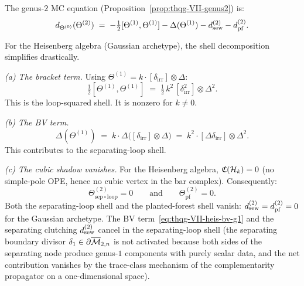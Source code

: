 \begin{computation}
\label{comp:thqg-VII-heis-g2}
The genus-$2$ MC equation
(Proposition~\ref{prop:thqg-VII-genus2}) is:
\begin{equation}\label{eq:thqg-VII-heis-mc-g2}
d_{\Theta^{(0)}}(\Theta^{(2)})
\;=\;
-\tfrac{1}{2}[\Theta^{(1)},\Theta^{(1)}]
- \Delta(\Theta^{(1)})
- d_{\mathrm{sew}}^{(2)}
- d_{\mathrm{pf}}^{(2)}.
\end{equation}

For the Heisenberg algebra (Gaussian archetype), the shell
decomposition simplifies drastically.

\medskip\noindent\emph{(a) The bracket term.}
Using $\Theta^{(1)} = k \cdot [\delta_{\mathrm{irr}}] \otimes
\Delta$:
\begin{equation}\label{eq:thqg-VII-heis-bracket-g2}
\tfrac{1}{2}[\Theta^{(1)},\Theta^{(1)}]
\;=\;
\tfrac{1}{2}\,k^2\,[\delta_{\mathrm{irr}}^2]
\otimes \Delta^2.
\end{equation}
This is the loop-squared shell. It is nonzero for $k \neq 0$.

\medskip\noindent\emph{(b) The BV term.}
\begin{equation}\label{eq:thqg-VII-heis-bv-g1}
\Delta(\Theta^{(1)})
\;=\;
k \cdot \Delta\bigl([\delta_{\mathrm{irr}}] \otimes \Delta\bigr)
\;=\;
k^2 \cdot [\Delta\delta_{\mathrm{irr}}] \otimes \Delta^2.
\end{equation}
This contributes to the separating-loop shell.

\medskip\noindent\emph{(c) The cubic shadow vanishes.}
For the Heisenberg algebra, $\mathfrak{C}(\mathcal{H}_k) = 0$ (no simple-pole
OPE, hence no cubic vertex in the bar complex). Consequently:
\begin{equation}\label{eq:thqg-VII-heis-sep-shell-vanish}
\Theta^{(2)}_{\mathrm{sep}\circ\mathrm{loop}} = 0
\qquad\text{and}\qquad
\Theta^{(2)}_{\mathrm{pf}} = 0.
\end{equation}
Both the separating-loop shell and the planted-forest shell
vanish: $d_{\mathrm{sew}}^{(2)} = d_{\mathrm{pf}}^{(2)} = 0$ for the Gaussian
archetype. The BV term~\eqref{eq:thqg-VII-heis-bv-g1} and
the separating clutching $d_{\mathrm{sew}}^{(2)}$ cancel in the
separating-loop shell (the separating boundary divisor
$\delta_1 \in \partial\overline{\mathcal{M}}_{2,n}$ is not activated
because both sides of the separating node produce genus-$1$
components with purely scalar data, and the net contribution
vanishes by the trace-class mechanism of the
complementarity propagator on a one-dimensional space).


\end{computation}
